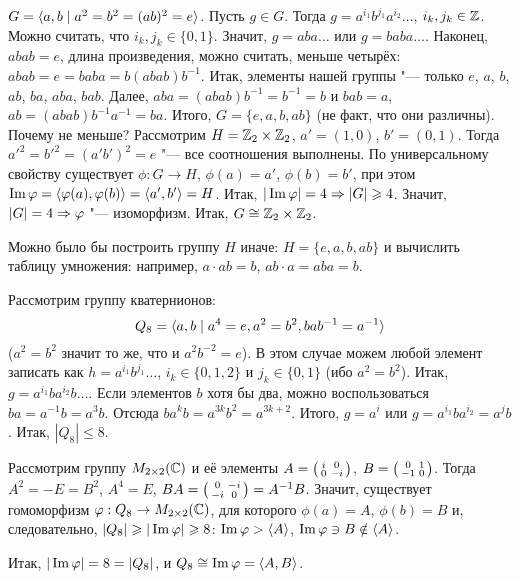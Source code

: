 \documentclass[main]{subfiles}
\begin{document}
\begin{example}
  $G = \GenGroup{a, b}[a^2 = b^2 = (ab)^2 = e]$.
  Пусть $g \in G$. Тогда $g = a^{i_1} b^{j_1} a^{i_2} \dots$,
  $i_k, j_k \in \mathbb{Z}$. Можно считать, что $i_k, j_k \in \{0, 1\}$.
  Значит, $g = aba\dots$ или $g = baba\dots$. Наконец, $abab = e$,
  длина произведения, можно считать, меньше четырёх:
  $abab = e = baba = b(abab)b^{-1}$.
  Итак, элементы нашей группы "--- только
  $e$, $a$, $b$, $ab$, $ba$, $aba$, $bab$.
  Далее, $aba = (abab)b^{-1} = b^{-1} = b$ и $bab = a$,
  $ab = (abab) b^{-1} a^{-1} = ba$. Итого, $G = \{ e, a, b, ab \}$
  (не факт, что они различны). Почему не меньше?
  Рассмотрим $H = \mathbb{Z}_2 \times \mathbb{Z}_2$,
  $a' = (1, 0)$, $b' = (0, 1)$. Тогда
  $a'^2 = b'^2 = (a'b')^2 = e$ "--- все соотношения выполнены.
  По универсальному свойству
  существует $\phi : G \to H$, $\phi(a) = a'$,
  $\phi(b) = b'$,
  при этом $\Img \phi = \GenGroup{\phi(a), \phi(b)}
  = \GenGroup{a', b'} = H$. Итак, $|\operatorname{Im} \varphi| = 4 \Rightarrow |G| \geqslant 4$.
  Значит, $|G| = 4 \Rightarrow \varphi$ "--- изоморфизм.
  Итак, $G \cong \mathbb{Z}_2 \times \mathbb{Z}_2$.
\end{example}
\begin{remark}
  Можно было бы построить группу $H$ иначе: $H = \{ e, a, b, ab \}$
  и вычислить таблицу умножения: например, $a \cdot ab = b$,
  $ab \cdot a = aba = b$.
\end{remark}

\begin{example}
  Рассмотрим группу кватернионов:
  \[
    Q_8 = \GenGroup{a, b}[a^4 = e, a^2 = b^2, bab^{-1} = a^{-1}]
  \]
  ($a^2 = b^2$ значит то же, что и $a^2 b^{-2} = e$).
  В этом случае можем любой элемент записать как $h = a^{i_1} b^{j_1}\dots$,
  $i_k \in \{ 0, 1, 2 \}$ и $j_k \in \{ 0, 1 \}$ (ибо $a^2 = b^2$).
  Итак, $g = a^{i_1} b a^{i_2} b \dots$. Если элементов $b$ хотя бы два, можно
  воспользоваться $ba = a^{-1} b = a^3 b$. Отсюда
  $ba^k b = a^{3k} b^2 = a^{3k + 2}$. Итого, $g = a^i$ или $g = a^{i_1} b a^{i_2}
  = a^{j} b$. Итак, $|Q_8| \le 8$.

  Рассмотрим группу $\Matrices[\Complex]{2}{2}$
  и её элементы $A = \begin{psmallmatrix} i & 0 \\ 0 & -i \end{psmallmatrix}$,
  $B = \begin{psmallmatrix} 0 & 1 \\ -1 & 0 \end{psmallmatrix}$.
  Тогда
  $A^2 = -E = B^2$, $A^4 = E$,
  $BA = \begin{psmallmatrix} 0 & -i \\ -i & 0 \end{psmallmatrix} = A^{-1} B$.
  Значит, существует гомоморфизм
  \( \phi : Q_8 \to \Matrices[\Complex]{2}{2} \),
  для которого \( \phi(a) = A \), \( \phi(b) = B \)
  и, следовательно, $|Q_8| \geqslant |\operatorname{Im} \varphi| \geqslant 8$:
  $\operatorname{Im} \varphi > \langle A \rangle$,
  $\operatorname{Im} \varphi \ni B \notin \langle A \rangle$.
  
  Итак, $|\operatorname{Im} \varphi| = 8 = |Q_8|$,
  и $Q_8 \cong \Img \phi = \GenGroup{A, B}$.
\end{example}
\end{document}
